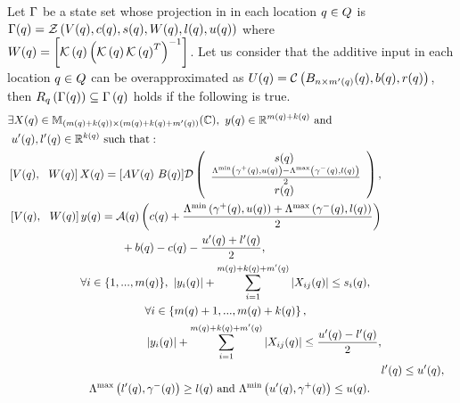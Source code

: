 \begin{lemma}
  Let  
  $\Gamma$ be a state set whose projection in in each
  location $q\in Q$ is $\Gamma(q) =
  \mathcal{Z}\left(V(q),c(q),s(q),W(q),l(q),u(q)\right)$ where
  $W(q)={\left[\mathcal{K}\left(q\right)\left(\mathcal{K}\left(q\right)\mathcal{K}\left(q\right)^T\right)^{-1}\right]}$.  Let us consider that the additive input in each location
  $q\in Q$ can be overapproximated as $U(q) = \mathcal{C}\left(B_{n\times
      m^\prime(q)}(q),b(q),r(q)\right)$, then
   $R_{q}\left(\Gamma(q)\right)
  \subseteq \Gamma\left(q\right)$ holds if the following is true.
\begin{align}
\begin{split}
& \exists X(\loc)\in\mat{\lt(m(\loc)+k(\loc)\rt)}{\lt(m(\loc)+k(\loc)+m^\pr(\loc)\rt)}{\mb{C}},~
y(\loc)\in\realset^{m(\loc)+k(\loc)}~\text{and}\\&~u^\pr(\loc),l^\pr(\loc)\in\realset^{k(\loc)}~\text{such that}:\\
& \left[V(\loc),~~W(\loc)\rt]X(\loc) =
  [AV(\loc)~B(\loc)]\dg\lt(\cjoin{\hspace{3em}~~~~~~~~s(\loc)}{\frac{\minaffine{\stay^+(\loc)}{u(\loc)}
      -\maxaffine{\stay^-(\loc)}{l(\loc)}}{2}}{\hspace{3em}~~~~~~~~r(\loc)}\rt),
\end{split}\\
\begin{split}
  & \left[V(\loc),~~W(\loc)\rt]y(\loc) = 
    \map(\loc)\lt(c(\loc)+\frac{\minaffine{\stay^+(\loc)}{u(\loc)}
     +\maxaffine{\stay^-(\loc)}{l(\loc)}}{2}\rt)\\ & \hspace{10em} +
  b(\loc)-c(\loc)-\frac{u^\pr(\loc)+l^\pr(\loc)}{2},
\end{split}\\
\begin{split}
& \forall
i\in\tup{m(\loc)},~\lt|y_i(\loc)\rt|+\sum_{i=1}^{m(\loc)+k(\loc)+m^\pr(\loc)}\lt|X_{ij}(\loc)\rt|\leq
s_i(\loc),
\end{split}\\
\begin{split}
& \forall
i\in\lt\{m(\loc)+1,...,m(\loc)+k(\loc)\rt\},\\
&\lt|y_i(\loc)\rt|+\sum_{i=1}^{m(\loc)+k(\loc)+m^\pr(\loc)}\lt|X_{ij}(\loc)\rt|\leq
\frac{u^\pr(\loc)-l^\pr(\loc)}{2},
\end{split}\\
& l^\pr(\loc)\leq u^\pr(\loc),\\
\begin{split}
& \maxaffine{l^\pr(\loc)}{\stay^-(\loc)}\geq
l(\loc)~\text{and}~\minaffine{u^\pr(\loc)}{\stay^+(\loc)}\leq u(\loc).
\end{split}
\end{align}
\end{lemma}
